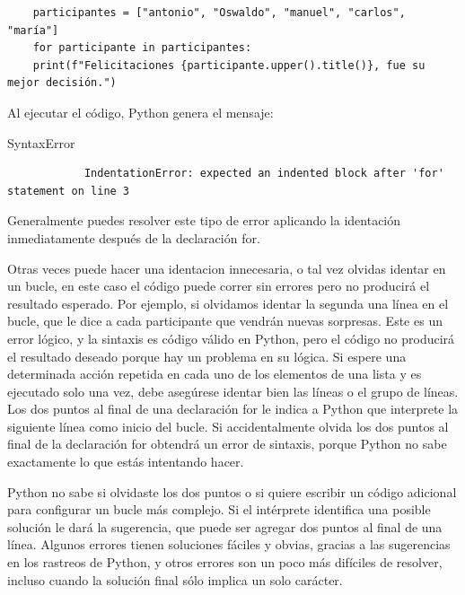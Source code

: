 \begin{lstlisting}
	participantes = ["antonio", "Oswaldo", "manuel", "carlos", "maría"]
	for participante in participantes:
	print(f"Felicitaciones {participante.upper().title()}, fue su mejor decisión.")	
\end{lstlisting} 

\noindent Al ejecutar el código,  Python genera el mensaje:\\

{\ttfamily\scriptsize\scriptsize 
	\hspace{-0.65cm} SyntaxError \vspace{-0.3cm}	
	{\color{blue} 	
		\begin{verbatim}
			IndentationError: expected an indented block after 'for' statement on line 3
		\end{verbatim}
}}



Generalmente puedes resolver este tipo de error  aplicando la identación inmediatamente después de la declaración {\ttfamily for}.

Otras veces puede hacer una identacion innecesaria, o tal vez olvidas identar en un bucle, en este caso el código puede  correr sin errores pero no producirá el resultado esperado. Por ejemplo, si olvidamos identar la segunda una línea en el bucle, que le dice a cada participante que vendrán nuevas sorpresas. Este es un error lógico, y la sintaxis es código válido en Python, pero el código no producirá el resultado deseado porque hay un problema en su lógica. Si espere una determinada acción repetida en cada uno de los elementos de una lista y es ejecutado solo una vez, debe  asegúrese  identar bien las líneas o el  grupo de líneas.\\


Los dos puntos al final de una declaración {\ttfamily for} le indica a Python que interprete la siguiente
línea como inicio del bucle. Si accidentalmente olvida los dos puntos al final de la declaración {\ttfamily for} 
obtendrá un error de sintaxis, porque Python no sabe exactamente lo que estás intentando hacer. 

Python no sabe si olvidaste los dos puntos o si  quiere escribir 
un código adicional para configurar un bucle más complejo. Si el intérprete 
identifica una posible solución   le dará la  sugerencia,  que puede ser agregar dos puntos al final
de una línea. Algunos errores tienen soluciones fáciles y obvias, gracias a las sugerencias 
en los rastreos de Python, y otros errores son un poco más difíciles de resolver, 
incluso cuando la solución final sólo implica un solo carácter. 


